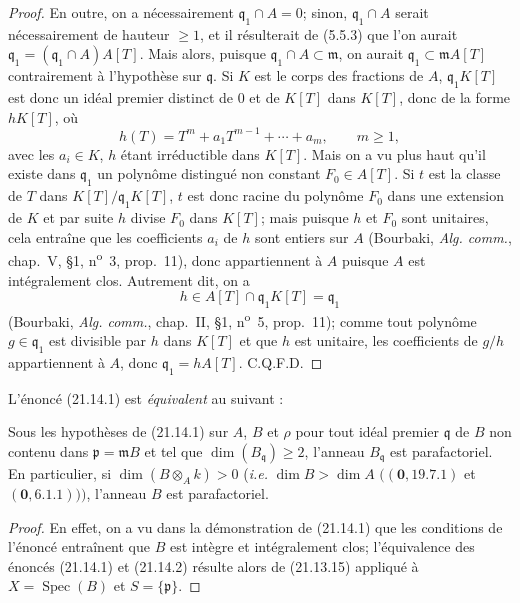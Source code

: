 \begin{proof}
En outre, on a nécessairement $\mathfrak q_1\cap A=0$; sinon,
$\mathfrak q_1\cap A$ serait nécessairement de hauteur $\geq1$, et il résulterait de
(5.5.3) que l'on aurait $\mathfrak q_1=(\mathfrak q_1\cap A)A[T]$. Mais alors,
puisque $\mathfrak q_1\cap A\subset\mathfrak m$, on aurait
$\mathfrak q_1\subset\mathfrak mA[T]$ contrairement à l'hypothèse sur
$\mathfrak q$. Si $K$ est le corps des fractions de $A$, $\mathfrak q_1K[T]$ est
donc un idéal premier distinct de $0$ et de $K[T]$ dans $K[T]$, donc de la forme
$hK[T]$, où
\[
  h(T)=T^m+a_1T^{m-1}+\cdots+a_m,
  \qquad m\geq1,
\]
avec les $a_i\in K$, $h$ étant irréductible dans $K[T]$. Mais on a vu plus haut qu'il
existe dans $\mathfrak q_1$ un polynôme distingué non constant $F_0\in A[T]$. Si $t$
est la classe de $T$ dans $K[T]/\mathfrak q_1K[T]$, $t$ est donc racine du polynôme
$F_0$ dans une extension de $K$ et par suite $h$ divise $F_0$ dans $K[T]$; mais
puisque $h$ et $F_0$ sont unitaires, cela entraîne que les coefficients $a_i$ de $h$
sont entiers sur $A$ (Bourbaki, \emph{Alg. comm.}, chap.~V, \S1,
n\textsuperscript{o}~3, prop.~11), donc appartiennent à $A$ puisque $A$ est
intégralement clos. Autrement dit, on a
\[
  h\in A[T]\cap\mathfrak q_1K[T]=\mathfrak q_1
\]
(Bourbaki, \emph{Alg. comm.}, chap.~II, \S1, n\textsuperscript{o}~5, prop.~11);
comme tout polynôme $g\in\mathfrak q_1$ est divisible par $h$ dans $K[T]$ et que $h$
est unitaire, les coefficients de $g/h$ appartiennent à $A$, donc
$\mathfrak q_1=hA[T]$. C.Q.F.D.
\end{proof}

L'énoncé (21.14.1) est \emph{équivalent} au suivant :

\begin{corollary}[21.14.2]
\label{IV.21.14.2}
Sous les hypothèses de (21.14.1) sur $A$, $B$ et $\rho$ pour tout idéal premier
$\mathfrak q$ de $B$ non contenu dans $\mathfrak p=\mathfrak mB$ et tel que
$\dim(B_\mathfrak q)\geq2$, l'anneau $B_\mathfrak q$ est parafactoriel. En
particulier, si $\dim(B\otimes_A k)>0$ (\emph{i.e.} $\dim B>\dim A$
$((\mathbf 0, 19.7.1)$ et $(\mathbf 0, 6.1.1)))$, l'anneau $B$ est parafactoriel.
\end{corollary}

\begin{proof}
En effet, on a vu dans la démonstration de (21.14.1) que les conditions de l'énoncé
entraînent que $B$ est intègre et intégralement clos; l'équivalence des énoncés
(21.14.1) et (21.14.2) résulte alors de (21.13.15) appliqué à
$X=\operatorname{Spec}(B)$ et $S=\{\mathfrak p\}$.
\end{proof}

